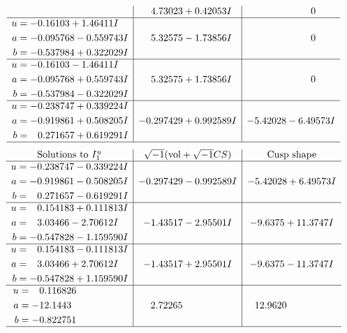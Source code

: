 \documentclass[1p]{elsarticle_modified}
\theoremstyle{definition}
\newcommand{\I}{\sqrt{-1}}
\begin{document}
$$\begin{array}{c|c|c}
 & \phantom{-}4.73023 + 0.42053 I & \phantom{-0.000000 } 0 \\ \hline\begin{aligned}
u &= -0.16103 + 1.46411 I \\
a &= -0.095768 - 0.559743 I \\
b &= -0.537984 + 0.322029 I\end{aligned}
 & \phantom{-}5.32575 - 1.73856 I & \phantom{-0.000000 } 0 \\ \hline\begin{aligned}
u &= -0.16103 - 1.46411 I \\
a &= -0.095768 + 0.559743 I \\
b &= -0.537984 - 0.322029 I\end{aligned}
 & \phantom{-}5.32575 + 1.73856 I & \phantom{-0.000000 } 0 \\ \hline\begin{aligned}
u &= -0.238747 + 0.339224 I \\
a &= -0.919861 + 0.508205 I \\
b &= \phantom{-}0.271657 + 0.619291 I\end{aligned}
 & -0.297429 + 0.992589 I & -5.42028 - 6.49573 I\\
 \hline 
 \end{array}$$\newpage$$\begin{array}{c|c|c}  
\text{Solutions to }I^u_{1}& \I (\text{vol} + \sqrt{-1}CS) & \text{Cusp shape}\\
 \hline 
\begin{aligned}
u &= -0.238747 - 0.339224 I \\
a &= -0.919861 - 0.508205 I \\
b &= \phantom{-}0.271657 - 0.619291 I\end{aligned}
 & -0.297429 - 0.992589 I & -5.42028 + 6.49573 I \\ \hline\begin{aligned}
u &= \phantom{-}0.154183 + 0.111813 I \\
a &= \phantom{-}3.03466 - 2.70612 I \\
b &= -0.547828 - 1.159590 I\end{aligned}
 & -1.43517 - 2.95501 I & -9.6375 + 11.3747 I \\ \hline\begin{aligned}
u &= \phantom{-}0.154183 - 0.111813 I \\
a &= \phantom{-}3.03466 + 2.70612 I \\
b &= -0.547828 + 1.159590 I\end{aligned}
 & -1.43517 + 2.95501 I & -9.6375 - 11.3747 I \\ \hline\begin{aligned}
u &= \phantom{-}0.116826\phantom{ +0.000000I} \\
a &= -12.1443\phantom{ +0.000000I} \\
b &= -0.822751\phantom{ +0.000000I}\end{aligned}
 & \phantom{-}2.72265\phantom{ +0.000000I} & \phantom{-}12.9620\phantom{ +0.000000I}\\
 \hline 
 \end{array}$$\newpage\newpage\renewcommand{\arraystretch}{1}
\end{document}
